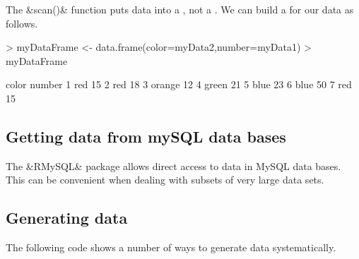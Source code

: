 %
The &scan()& function puts data into a , not a .  We can
build a  for our data as follows.

\begin{Schunk}
\begin{Sinput}
> myDataFrame <- data.frame(color=myData2,number=myData1)
> myDataFrame
\end{Sinput}
\begin{Soutput}
   color number
1    red     15
2    red     18
3 orange     12
4  green     21
5   blue     23
6   blue     50
7    red     15
\end{Soutput}
\end{Schunk}

\subsection{Getting data from mySQL data bases}

The &RMySQL& package allows direct access to data in MySQL data bases.
This can be convenient when dealing with subsets of very large data sets.
%
%


\subsection{Generating data}
\label{sec:generatingData}
%
%
%
%
%

The following code shows a number of ways to generate data systematically.

